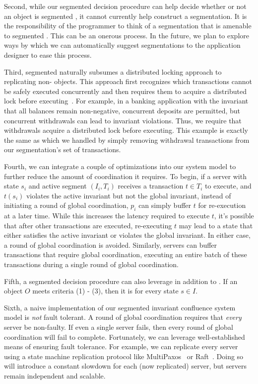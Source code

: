 Second, while our segmented \invariantconfluence{} decision procedure can help
decide whether or not an object is segmented \invariantconfluent{}, it cannot
currently help construct a segmentation. It is the responsibility of the
programmer to think of a segmentation that is amenable to segmented
\invariantconfluence{}. This can be an onerous process. In the future, we
plan to explore ways by which we can automatically suggest segmentations to the
application designer to ease this process.

Third, segmented \invariantconfluence{} naturally subsumes a distributed
locking approach to replicating non-\invariantconfluent{} objects. This
approach first recognizes which transactions cannot be safely executed
concurrently and then requires them to acquire a distributed lock before
executing~\cite{balegas2015putting, gotsman2016cause}. For example, in a
banking application with the invariant that all balances remain non-negative,
concurrent deposits are permitted, but concurrent withdrawals can lead to
invariant violations. Thus, we require that withdrawals acquire a distributed
lock before executing. This example is exactly the same as
 which we handled by simply removing
withdrawal transactions from our segmentation's set of transactions.

Fourth, we can integrate a couple of optimizations into our system model to
further reduce the amount of coordination it requires. To begin, if a server
with state $s_i$ and active segment $(I_i, T_i)$ receives a transaction $t
\in T_i$ to execute, and $t(s_i)$ violates the active invariant but not the
global invariant, instead of initiating a round of global coordination, $p_i$
can simply buffer $t$ for re-execution at a later time. While this increases
the latency required to execute $t$, it's possible that after other
transactions are executed, re-executing $t$ may lead to a state that either
satisfies the active invariant or violates the global invariant. In either
case, a round of global coordination is avoided. Similarly, servers can
buffer transactions that require global coordination, executing an entire
batch of these transactions during a single round of global coordination.

Fifth, a segmented \invariantconfluence{} decision procedure can also
leverage  in addition to
. If an object $O$ meets
criteria (1) - (3), then it is  for every state $s \in
I$.

Sixth, a naive implementation of our segmented invariant confluence system
model is \emph{not} fault tolerant. A round of global coordination requires
that \emph{every} server be non-faulty. If even a single server fails, then
every round of global coordination will fail to complete. Fortunately, we can
leverage well-established means of ensuring fault tolerance. For example, we
can replicate every server using a state machine replication protocol like
MultiPaxos~\cite{lamport1998part, lamport2001paxos} or
Raft~\cite{ongaro2014search}. Doing so will introduce a constant slowdown for
each (now replicated) server, but servers remain independent and scalable.
